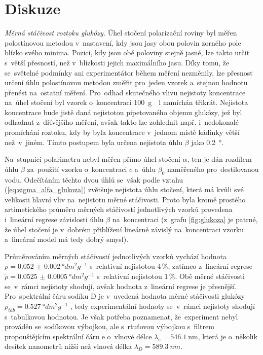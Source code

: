 \documentclass{../concepts/titul_protokol_p/prepareprotokol} %
\begin{document}
\section{Diskuze}

\textit{Měrná stáčivost roztoku glukózy.} Úhel stočení polarizační roviny byl měřen polostínovou metodou v~nastavení,
kdy jsou jasy obou polovin zorného pole blízko svého minima. Pozici, kdy jsou obě poloviny stejně jasné, lze takto
určit s~větší přesností, než v~blízkosti jejich maximálního jasu. Díky tomu, že se~světelné podmínky ani experimentátor 
během měření nezměnily,
lze přesnost určení úhlu polostínovou metodou změřit pro~jeden vzorek a~stejnou hodnotu přenést na~ostatní měření.
Pro~odhad skutečného vlivu nejistoty koncentrace na~úhel stočení byl vzorek o~koncentraci \qty{100}{g \per l} namíchán
třikrát. Nejistota koncentrace bude jistě daná nejistotou pipetovaného objemu glukózy, jež byl odhadnut z~dřívějšího měření,
avšak takto lze zohlednit např. i~nedokonalé promíchání roztoku, kdy by byla koncentrace v~jednom místě kádinky větší než~v~jiném.
Tímto postupem byla určena nejistota úhlu $\beta$ jako \qty{0.2}{\degree}.

Na~stupnici polarimetru nebyl měřen přímo úhel stočení $\alpha$, ten je dán rozdílem úhlu $\beta$ za~použití vzorku o~koncentraci
$c$ a~úhlu $\beta_0$ naměřeného pro~destilovanou vodu. Odečítáním těchto dvou úhlů se~však podle vztahu
(\ref{eq:sigma_alfa_glukoza}) zvětšuje nejistota úhlu stočení, která má kvůli své velikosti hlavní vliv na~nejistotu měrné
stáčivosti. Proto byla kromě prostého artimetického průměru měrných stáčivostí jednotlivých vzorků provedena i~lineární regrese
závislosti úhlu $\beta$ na~koncentraci (z~grafu \ref{fig:glukoza} je patrné, že úhel stočení je v~dobrém přiblížení lineárně 
závislý na~koncentraci vzorku a~lineární model má tedy dobrý smysl). 

Průměrováním měrných stáčivostí jednotlivých vzorků vychází hodnota $\overline{\rho} = \qty{0.052(2)}{\degree dm^{2} g^{-1}}$
s~relativní nejistotou $4\,\%$, zatímco z~lineární regrese $\tilde{\rho} = \qty{0.0525(5)}{ \degree dm^2 g^{-1} }$ s~relativní
nejistotou $1\,\%$. Obě měrné stáčivosti se~v~rámci nejistoty shodují, avšak hodnota z~lineární regrese je přesnější.
Pro~spektrální čáru sodíku D je v~uvedená hodnota měrné stáčivosti glukózy $\rho_{tab} = \qty{0.527}{\degree dm^2 g^{-1}}$
\cite{weast}, tedy experimentální hodnoty se~v~rámci nejistoty shodují s~tabulkovou hodnotou. Je však potřeba poznamenat,
že~experiment nebyl prováděn se~sodíkovou výbojkou, ale s~rtuťovou výbojkou s~filtrem propouštějícím spektrální čáru e
o~vlnové délce $\lambda_e = \qty{546.1}{\nano\meter}$, která je o~několik desítek nanometrů nižší než vlnová délka
$\lambda_D = \qty{589.3}{nm}$.
\end{document}
